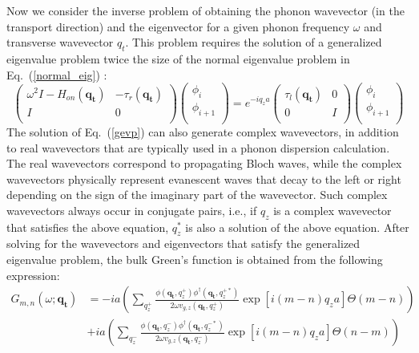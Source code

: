 \documentclass[11pt]{article}
\begin{document}
Now we consider the inverse problem of obtaining the phonon wavevector (in the transport direction) and the eigenvector for a given phonon frequency $\omega$ and transverse wavevector $q_{t}$. This problem requires the solution of a generalized eigenvalue problem twice the size of the normal eigenvalue problem in Eq.~(\ref{normal_eig}) \cite{khomyakov2005conductance,luisier2006atomistic}: 
\begin{equation}
\left({\begin{array}{cc}
\omega^2I-H_{on}(\boldsymbol{q_{t}}) & -\tau_r(\boldsymbol{q_{t}}) \\ I & 0\\ \end{array}}\right)\left({\begin{array}{c} \phi_i \\ \phi_{i+1}\\ \end{array}} \right) = 
e^{-iq_za}\left({\begin{array}{cc}
\tau_l(\boldsymbol{q_{t}}) & 0 \\ 0 & I\\ \end{array}}\right)\left({\begin{array}{c} \phi_i \\ \phi_{i+1}\\ \end{array}} \right)
\label{gevp}
\end{equation}  
The solution of Eq.~(\ref{gevp}) can also generate complex wavevectors, in addition to real wavevectors that are typically used in a phonon dispersion calculation. The real wavevectors correspond to propagating Bloch waves, while the complex wavevectors physically represent evanescent waves that decay to the left or right depending on the sign of the imaginary part of the wavevector. Such complex wavevectors always occur in conjugate pairs, i.e., if $q_z$ is a complex wavevector that satisfies the above equation, $q_z^*$ is also a solution of the above equation. After solving for the wavevectors and eigenvectors that satisfy the generalized eigenvalue problem, the bulk Green's function is obtained from the following expression:
\begin{equation}
\begin{split}
G_{m,n}(\omega;\boldsymbol{q_{t}}) & = -ia\left(\sum\limits_{q_z^+}\frac{\phi(\boldsymbol{q_{t}},q_z^+)\phi^{\dagger}(\boldsymbol{q_{t}},q_z^{+*})}{2\omega v_{g,z}(\boldsymbol{q_{t}},q_z^+)}\exp{[i(m-n)q_za]}\Theta(m-n)\right) \\  & +ia\left(\sum\limits_{q_z^-}\frac{\phi(\boldsymbol{q_{t}},q_z^-)\phi^{\dagger}(\boldsymbol{q_{t}},q_z^{-*})}{2\omega v_{g,z}(\boldsymbol{q_{t}},q_z^{-})}\exp{[i(m-n)q_za]}\Theta(n-m)\right)
\end{split}
\label{bulk_G}
\end{equation}
\end{document}
